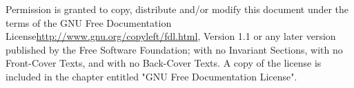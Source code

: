Permission is granted to copy, distribute and/or modify this document
under the terms of the GNU Free Documentation
License\url{http://www.gnu.org/copyleft/fdl.html}, Version 1.1 or any
later version published by the Free Software Foundation; with no
Invariant Sections, with no Front-Cover Texts, and with no Back-Cover
Texts.  A copy of the license is included in the chapter entitled "GNU
Free Documentation License".